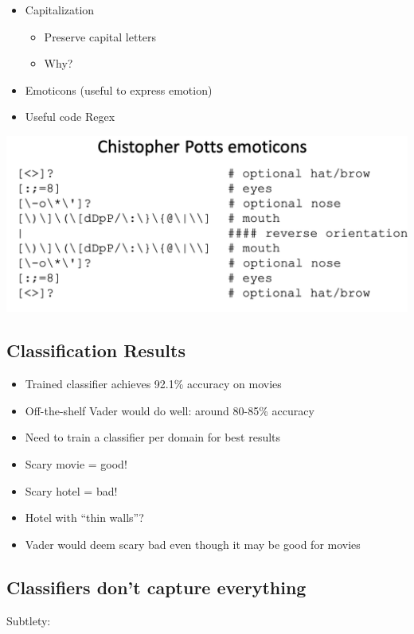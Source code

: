 \documentclass[11pt]{article}
\theoremstyle{definition}
\begin{document}
\begin{itemize}
  \item Capitalization
  \begin{itemize}
    \item Preserve capital letters
    \item Why?
  \end{itemize}
  \item Emoticons (useful to express emotion)
  \item Useful code Regex
\end{itemize}
\includegraphics[width=\textwidth]{13.png}

\subsection{Classification Results}
\begin{itemize}
  \item Trained classifier achieves 92.1\% accuracy on movies
  \item Off-the-shelf Vader would do well: around 80-85\% accuracy
\end{itemize}
\begin{itemize}
  \item Need to train a classifier per domain for best results
  \item Scary movie = good!
  \item Scary hotel = bad!
  \item Hotel with “thin walls”?
  \item Vader would deem scary bad even though it may be good for movies
\end{itemize}

\subsection{Classifiers don’t capture everything}
Subtlety:
\end{document}
